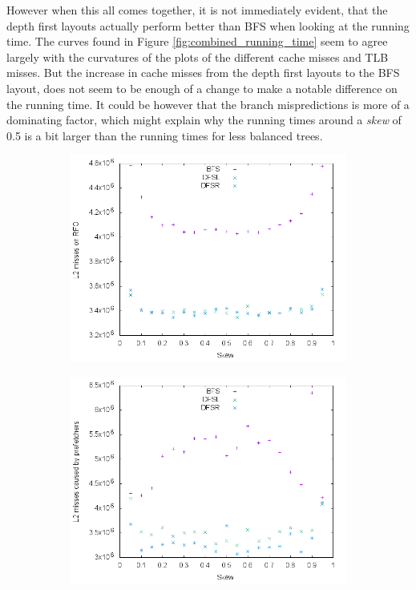 \documentclass{article}
\begin{document}
However when this all comes together, it is not immediately evident, that the depth first layouts actually perform better than BFS when looking at the running time. The curves found in Figure \ref{fig:combined_running_time} seem to agree largely with the curvatures of the plots of the different cache misses and TLB misses. But the increase in cache misses from the depth first layouts to the BFS layout, does not seem to be enough of a change to make a notable difference on the running time. It could be however that the branch mispredictions is more of a dominating factor, which might explain why the running times around a \textit{skew} of 0.5 is a bit larger than the running times for less balanced trees.

\begin{figure}[H]
	\centering
	\begin{subfigure}[b]{0.49\textwidth}
		\includegraphics[width=\textwidth]{figures/combined_L2}	
	\end{subfigure}
	\begin{subfigure}[b]{0.49\textwidth}
		\includegraphics[width=\textwidth]{figures/combined_L2_PF}	

\end{subfigure}
\end{figure}
\end{document}
